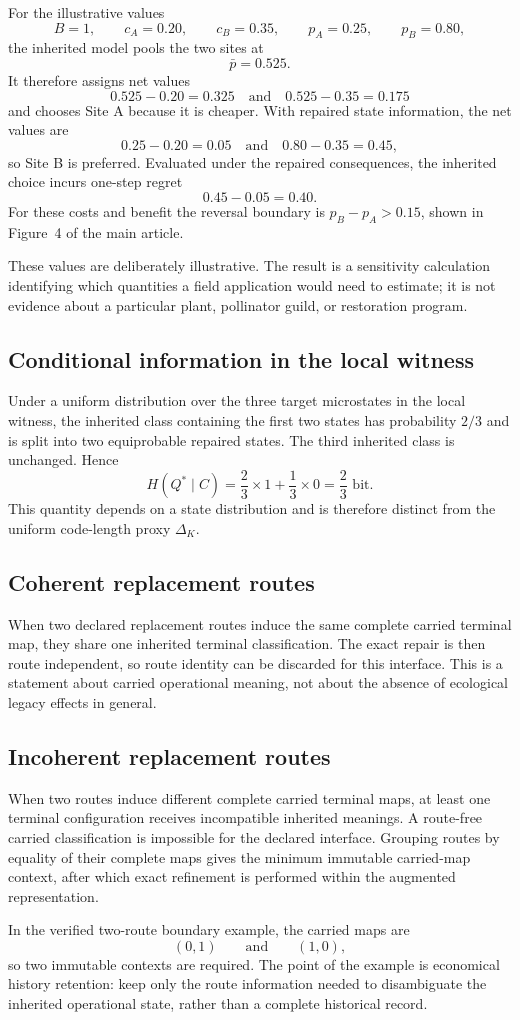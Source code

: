 For the illustrative values
\[
B=1,\qquad c_A=0.20,\qquad c_B=0.35,
\qquad p_A=0.25,\qquad p_B=0.80,
\]
the inherited model pools the two sites at
\[
\bar p=0.525.
\]
It therefore assigns net values
\[
0.525-0.20=0.325\quad\text{and}\quad 0.525-0.35=0.175
\]
and chooses Site A because it is cheaper. With repaired state information, the net values are
\[
0.25-0.20=0.05\quad\text{and}\quad 0.80-0.35=0.45,
\]
so Site B is preferred. Evaluated under the repaired consequences, the inherited choice incurs one-step regret
\[
0.45-0.05=0.40.
\]
For these costs and benefit the reversal boundary is $p_B-p_A>0.15$, shown in Figure~4 of the main article.

These values are deliberately illustrative. The result is a sensitivity calculation identifying which quantities a field application would need to estimate; it is not evidence about a particular plant, pollinator guild, or restoration program.

\subsection{Conditional information in the local witness}
Under a uniform distribution over the three target microstates in the local witness, the inherited class containing the first two states has probability $2/3$ and is split into two equiprobable repaired states. The third inherited class is unchanged. Hence
\[
H(Q^\ast\mid C)=\frac{2}{3}\times 1+\frac{1}{3}\times 0=\frac{2}{3}\text{ bit}.
\]
This quantity depends on a state distribution and is therefore distinct from the uniform code-length proxy $\Delta_K$.

\subsection{Coherent replacement routes}
When two declared replacement routes induce the same complete carried terminal map, they share one inherited terminal classification. The exact repair is then route independent, so route identity can be discarded for this interface. This is a statement about carried operational meaning, not about the absence of ecological legacy effects in general.

\subsection{Incoherent replacement routes}
When two routes induce different complete carried terminal maps, at least one terminal configuration receives incompatible inherited meanings. A route-free carried classification is impossible for the declared interface. Grouping routes by equality of their complete maps gives the minimum immutable carried-map context, after which exact refinement is performed within the augmented representation.

In the verified two-route boundary example, the carried maps are
\[
(0,1)\qquad\text{and}\qquad(1,0),
\]
so two immutable contexts are required. The point of the example is economical history retention: keep only the route information needed to disambiguate the inherited operational state, rather than a complete historical record.
